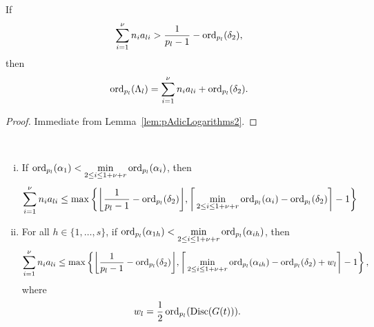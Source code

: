 \begin{lemma} \label{lem:Lambda}
If 
\[\sum_{i = 1}^{\nu} n_{i}a_{li} > \frac{1}{p_l-1} - \operatorname{ord}_{p_l}(\delta_2),\]
then
\[\operatorname{ord}_{p_l}(\Lambda_l) = \sum_{i = 1}^{\nu} n_{i}a_{li} + \operatorname{ord}_{p_l}(\delta_2).\]
\end{lemma}

\begin{proof}
Immediate from Lemma~\ref{lem:pAdicLogarithms2}.
\end{proof}

\begin{lemma} \label{lem:specialcase} \
\begin{enumerate}[(i)]
\item If $\operatorname{ord}_{p_l}(\alpha_1) < \displaystyle \min_{2 \leq i \leq 1+\nu+r} \operatorname{ord}_{p_l}(\alpha_i)$, then
\[\sum_{i = 1}^{\nu} n_i a_{li} \leq \max \left\{ \bigg\lfloor{\frac{1}{p_l-1} - \operatorname{ord}_{p_l}(\delta_2)}\bigg\rfloor,  \bigg \lceil\displaystyle \min_{2 \leq i \leq 1+\nu+r} \operatorname{ord}_{p_l}(\alpha_{i}) - \operatorname{ord}_{p_l}(\delta_2) \bigg \rceil - 1 \right\}\]
\item For all $h \in \{1, \dots, s\}$, if $\operatorname{ord}_{p_l}(\alpha_{1h}) < \displaystyle \min_{2 \leq i \leq 1+\nu+r} \operatorname{ord}_{p_l}(\alpha_{ih})$, then
\[\sum_{i = 1}^{\nu} n_i a_{li} \leq \max \left\{ \bigg\lfloor{\frac{1}{p_l-1} - \operatorname{ord}_{p_l}(\delta_2)}\bigg\rfloor, \bigg \lceil \displaystyle \min_{2 \leq i \leq 1+\nu+r} \operatorname{ord}_{p_l}(\alpha_{ih})- \operatorname{ord}_{p_l}(\delta_2) + w_l \bigg \rceil - 1\right\},\]
where 
\[w_l = \frac{1}{2}\operatorname{ord}_{p_l}(\text{Disc}(G(t))).\]
\end{enumerate}
\end{lemma}

